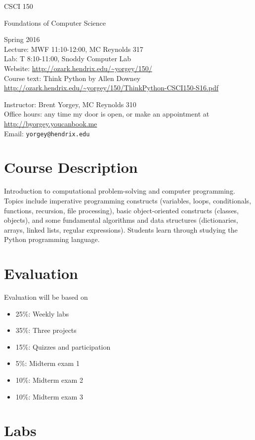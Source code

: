 \documentclass{article}
\begin{document}
{\Large
\noindent CSCI 150 \smallskip

\noindent Foundations of Computer Science \bigskip
}

\noindent Spring 2016 \\
Lecture: MWF 11:10-12:00, MC Reynolds 317\\
Lab: T 8:10-11:00, Snoddy Computer Lab\\
Website: \url{http://ozark.hendrix.edu/~yorgey/150/} \\
Course text: Think Python by Allen Downey \\
\indent \url{http://ozark.hendrix.edu/~yorgey/150/ThinkPython-CSCI150-S16.pdf}
\medskip

\noindent Instructor: Brent Yorgey, MC Reynolds 310 \\
Office hours: any time my door is open, or make an appointment at \\
\indent \url{http://byorgey.youcanbook.me} \\
Email: \texttt{yorgey@hendrix.edu} \medskip

\section*{Course Description}

Introduction to computational problem-solving and computer
programming. Topics include imperative programming constructs
(variables, loops, conditionals, functions, recursion, file
processing), basic object-oriented constructs (classes, objects), and
some fundamental algorithms and data structures (dictionaries, arrays,
linked lists, regular expressions). Students learn through studying
the Python programming language.

\section*{Evaluation}

Evaluation will be based on
\begin{itemize}
\item 25\%: Weekly labs
\item 35\%: Three projects
\item 15\%: Quizzes and participation
\item 5\%: Midterm exam 1
\item 10\%: Midterm exam 2
\item 10\%: Midterm exam 3
\end{itemize}

\section*{Labs}
\end{document}
